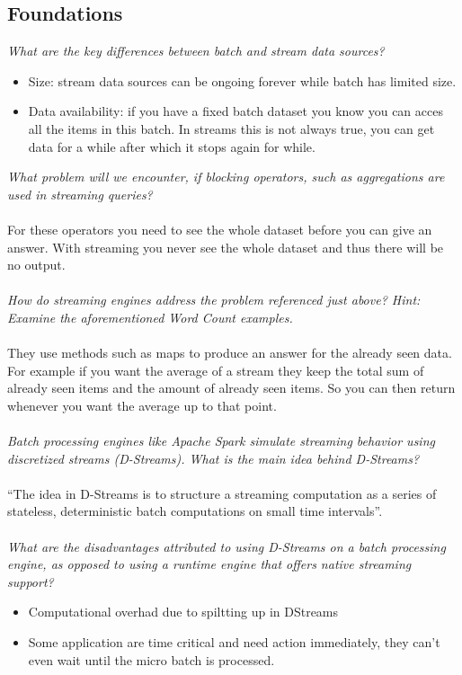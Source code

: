 \documentclass[11pt,a4paper,oneside]{article}
\begin{document}
\subsection{Foundations}
\textit{What are the key differences between batch and stream data sources?}
\begin{itemize}
\item Size: stream data sources can be ongoing forever while batch has limited size.
\item Data availability: if you have a fixed batch dataset you know you can acces all the items in this batch. In streams this is not always true, you can get data for a while after which it stops again for while.
\end{itemize}
\noindent
\textit{What problem will we encounter, if blocking operators, such as aggregations are used in streaming queries?}\\
\\
For these operators you need to see the whole dataset before you can give an answer. With streaming you never see the whole dataset and thus there will be no output.
\\
\\
\textit{How do streaming engines address the problem referenced just above? Hint: Examine the aforementioned Word Count examples.}\\
\\
They use methods such as maps to produce an answer for the already seen data.
For example if you want the average of a stream they keep the total sum of already seen items
and the amount of already seen items. So you can then return whenever you want the average up to that point.
\\
\\
\textit{Batch processing engines like Apache Spark simulate streaming behavior using discretized
streams (D-Streams). What is the main idea behind D-Streams?}\\
\\
``The idea in D-Streams is to structure a streaming computation
as a series of stateless, deterministic batch computations on small time intervals''.\cite{spark}
\\
\\
\textit{What are the disadvantages attributed to using D-Streams on a batch processing engine,
as opposed to using a runtime engine that offers native streaming support?}

\begin{itemize}
\item Computational overhad due to spiltting up in DStreams
\item Some application are time critical and need action immediately, they can't even wait until the micro batch is processed.
\end{itemize}
\end{document}
